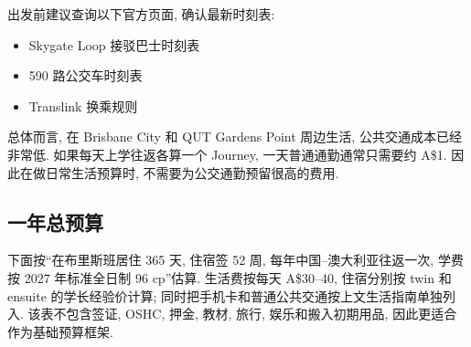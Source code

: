 \documentclass{jit-qut}
\begin{document}
出发前建议查询以下官方页面, 确认最新时刻表:

\begin{itemize}[itemsep=0.1em,topsep=0.2em]
  \item {}
  {Skygate Loop 接驳巴士时刻表}
  \item {}
  {590 路公交车时刻表}
  \item {}
  {Translink 换乘规则}
\end{itemize}



总体而言, 在 Brisbane City 和 QUT Gardens Point 周边生活, 公共交通成本已经非常低. 如果每天上学往返各算一个 Journey, 一天普通通勤通常只需要约 A\$1. 因此在做日常生活预算时, 不需要为公交通勤预留很高的费用. 

\subsection{一年总预算}

下面按``在布里斯班居住 365 天, 住宿签 52 周, 每年中国--澳大利亚往返一次, 学费按 2027 年标准全日制 96 cp''估算. 生活费按每天 A\$30--40, 住宿分别按 twin 和 ensuite 的学长经验价计算; 同时把手机卡和普通公共交通按上文生活指南单独列入. 该表不包含签证, OSHC, 押金, 教材, 旅行, 娱乐和搬入初期用品, 因此更适合作为基础预算框架.
\end{document}
